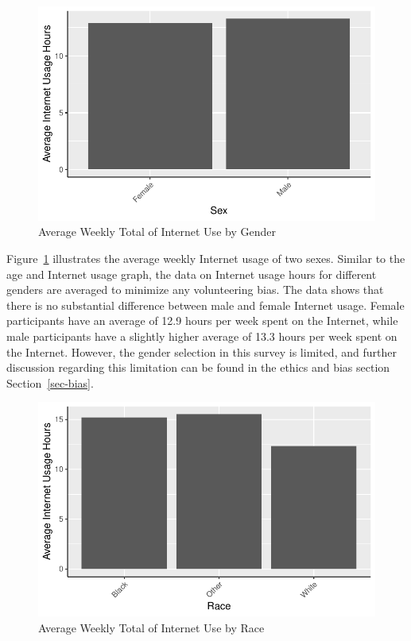 \documentclass[
]{article}
\begin{document}
\begin{figure}

{\centering \includegraphics{paper_files/figure-pdf/fig-genderandinternet-1.pdf}

}

\caption{\label{fig-genderandinternet}Average Weekly Total of Internet
Use by Gender}

\end{figure}

Figure~\ref{fig-genderandinternet} illustrates the average weekly
Internet usage of two sexes. Similar to the age and Internet usage
graph, the data on Internet usage hours for different genders are
averaged to minimize any volunteering bias. The data shows that there is
no substantial difference between male and female Internet usage. Female
participants have an average of 12.9 hours per week spent on the
Internet, while male participants have a slightly higher average of 13.3
hours per week spent on the Internet. However, the gender selection in
this survey is limited, and further discussion regarding this limitation
can be found in the ethics and bias section Section~\ref{sec-bias}.

\begin{figure}

{\centering \includegraphics{paper_files/figure-pdf/fig-raceandinternet-1.pdf}

}

\caption{\label{fig-raceandinternet}Average Weekly Total of Internet Use
by Race}

\end{figure}
\end{document}
